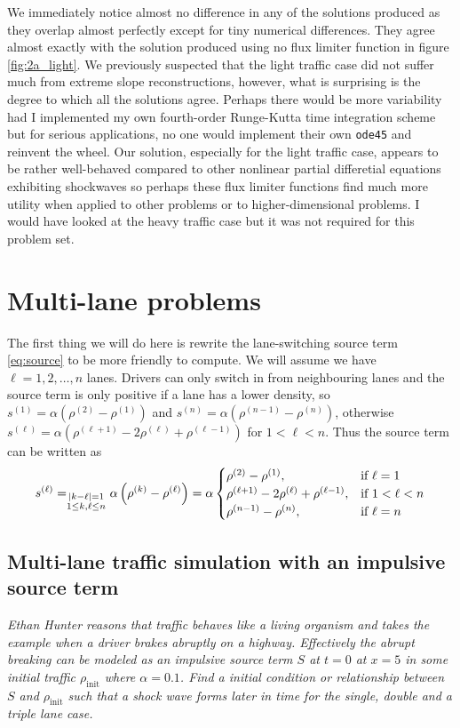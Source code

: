 \documentclass[11pt]{article}
\let\sumop\relax
\begin{document}
We immediately notice almost no difference in any of the solutions produced as they overlap almost perfectly except for tiny numerical differences. They agree almost exactly with the solution produced using no flux limiter function in figure \ref{fig:2a_light}. We previously suspected that the light traffic case did not suffer much from extreme slope reconstructions, however, what is surprising is the degree to which all the solutions agree. Perhaps there would be more variability had I implemented my own fourth-order Runge-Kutta time integration scheme but for serious applications, no one would implement their own \texttt{ode45} and reinvent the wheel. Our solution, especially for the light traffic case, appears to be rather well-behaved compared to other nonlinear partial differetial equations exhibiting shockwaves so perhaps these flux limiter functions find much more utility when applied to other problems or to higher-dimensional problems. I would have looked at the heavy traffic case but it was not required for this problem set.

\section{Multi-lane problems}
The first thing we will do here is rewrite the lane-switching source term \eqref{eq:source} to be more friendly to compute. We will assume we have $\ell=1,2,\dots,n$ lanes. Drivers can only switch in from neighbouring lanes and the source term is only positive if a lane has a lower density, so $s^{(1)} = \alpha \left( \rho^{(2)} - \rho^{(1)} \right)$ and $s^{(n)} = \alpha \left( \rho^{(n-1)} - \rho^{(n)} \right)$, otherwise $s^{(\ell)} = \alpha \left( \rho^{(\ell+1)} - 2\rho^{(\ell)} + \rho^{(\ell-1)} \right)$ for $1 < \ell < n$. Thus the source term can be written as 
\begin{equation} \label{eq:min_f}
s^{(\ell)} = \sumop_{\substack{|k-\ell|=1 \\ 1 \le k,\ell \le n}} \alpha \left( \rho^{(k)} - \rho^{(\ell)} \right) = \alpha
\begin{cases}
  \rho^{(2)} - \rho^{(1)},& \text{if } \ell = 1 \\
  \rho^{(\ell+1)} - 2\rho^{(\ell)} + \rho^{(\ell-1)},& \text{if } 1 < \ell < n \\
  \rho^{(n-1)} - \rho^{(n)},& \text{if } \ell = n
\end{cases}
\end{equation}

\subsection{Multi-lane traffic simulation with an impulsive source term}
\begin{tcolorbox}
  \textit{Ethan Hunter reasons that traffic behaves like a living organism and takes the example when a driver brakes abruptly on a highway. Effectively the abrupt breaking can be modeled as an impulsive source term $S$ at $t = 0$ at $x = 5$ in some initial traffic $\rho_\mathrm{init}$ where $\alpha = 0.1$. Find a initial condition or relationship between $S$ and $\rho_\mathrm{init}$ such that a shock wave forms later in time for the single, double and a triple lane case.}
\end{tcolorbox}
\end{document}
